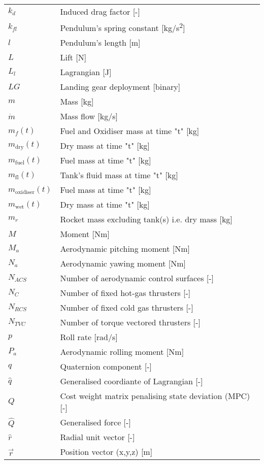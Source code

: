 \begin{longtable}{p{2.5cm}p{12cm}}
    $k_d$ & Induced drag factor [-] \\
    $k_{fl}$ & Pendulum's spring constant [kg/s\textsuperscript{2}] \\
    $l$ & Pendulum's length [m] \\
    $L$ & Lift [N] \\
    $L_l$ & Lagrangian [J] \\
    $LG$ & Landing gear deployment [binary] \\
    $m$ & Mass [kg] \\
    $\dot{m}$ & Mass flow [kg/s] \\
    $m_f(t)$ & Fuel and Oxidiser mass at time "t" [kg]\\
    $m_{\text{dry}}(t)$ & Dry mass at time "t" [kg] \\
    $m_{\text{fuel}}(t)$ & Fuel  mass at time "t" [kg]\\
    $m_{\text{fl}}(t)$ & Tank's fluid  mass at time "t" [kg]\\
    $m_{\text{oxidiser}}(t)$ & Fuel  mass at time "t" [kg]\\
    $m_{\text{wet}}(t)$ & Dry mass at time "t" [kg] \\
    $m_r$ & Rocket mass excluding tank(s) i.e. dry mass [kg] \\
    $M$ & Moment [Nm] \\
    $M_a$ & Aerodynamic pitching moment [Nm] \\
    $N_a$ & Aerodynamic yawing moment [Nm] \\
    $N_{ACS}$ & Number of aerodynamic control surfaces [-] \\
    $N_C$ & Number of fixed hot-gas thrusters [-] \\
    $N_{RCS}$ & Number of fixed cold gas thrusters [-] \\
    $N_{TVC}$ & Number of torque vectored thrusters [-] \\
    $p$ & Roll rate [rad/s] \\
    $P_a$ & Aerodynamic rolling moment [Nm] \\
    $q$ & Quaternion component [-] \\
    $\hat{q}$ & Generalised coordiante of Lagrangian [-] \\
    $Q$ & Cost weight matrix penalising state deviation (MPC) [-] \\
    $\hat{Q}$ & Generalised force [-] \\
    $\hat{r}$ & Radial unit vector [-] \\
    $\vec{r}$ & Position vector (x,y,z) [m] \\

\end{longtable}
